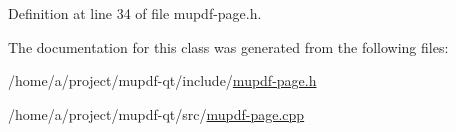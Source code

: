 Definition at line 34 of file mupdf-\/page.\-h.



The documentation for this class was generated from the following files\-:\begin{DoxyCompactItemize}
\item 
/home/a/project/mupdf-\/qt/include/\hyperlink{mupdf-page_8h}{mupdf-\/page.\-h}\item 
/home/a/project/mupdf-\/qt/src/\hyperlink{mupdf-page_8cpp}{mupdf-\/page.\-cpp}\end{DoxyCompactItemize}

